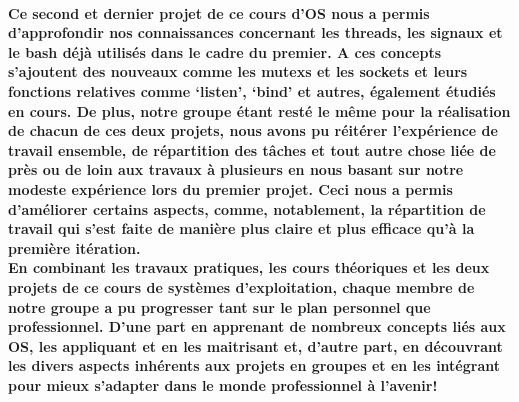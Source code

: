 \documentclass[utf8]{article}
\begin{document}
\paragraph{
Ce second et dernier projet de ce cours d'OS nous a permis d'approfondir nos connaissances concernant les threads, les signaux et le bash déjà utilisés dans le cadre du premier. A ces concepts
s'ajoutent des nouveaux comme les mutexs et les sockets et leurs fonctions relatives comme `listen', `bind' et autres, également étudiés en cours. De plus, notre groupe étant resté le même pour la
réalisation de chacun de ces deux projets, nous avons pu réitérer l'expérience de travail ensemble, de répartition des tâches et tout autre chose liée de près ou de loin aux travaux à plusieurs 
en nous basant sur notre modeste expérience lors du premier projet. Ceci nous a permis d'améliorer certains aspects, comme, notablement, la répartition de travail qui s'est faite de manière plus claire et plus
efficace qu'à la première itération. \\
En combinant les travaux pratiques, les cours théoriques et les deux projets de ce cours de systèmes d'exploitation, chaque membre de notre groupe a pu progresser tant sur le plan personnel que professionnel. 
D'une part en apprenant de nombreux concepts liés aux OS, les appliquant et en les maitrisant et, d'autre part, en découvrant les divers aspects inhérents aux projets en groupes et en les intégrant 
pour mieux s'adapter dans le monde professionnel à l'avenir!}
\end{document}
